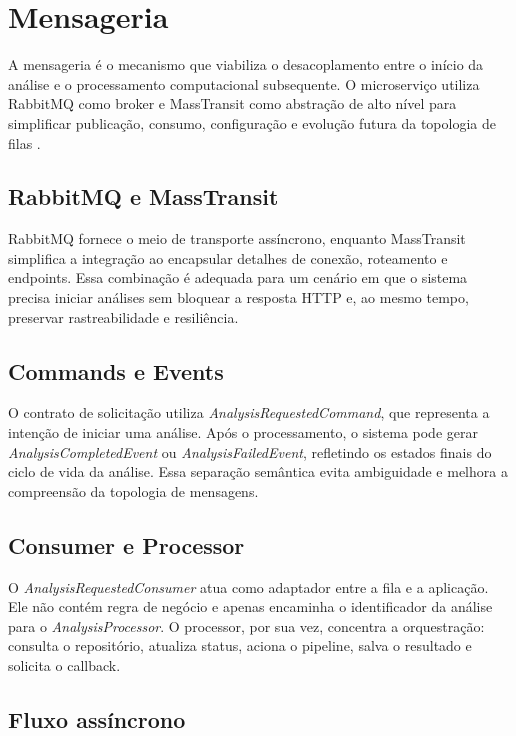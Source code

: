 \chapter{Mensageria}

A mensageria é o mecanismo que viabiliza o desacoplamento entre o início da análise e o processamento computacional subsequente. O microserviço utiliza RabbitMQ como broker e MassTransit como abstração de alto nível para simplificar publicação, consumo, configuração e evolução futura da topologia de filas \cite{rabbitmqdocs,masstransitdocs}.

\section{RabbitMQ e MassTransit}

RabbitMQ fornece o meio de transporte assíncrono, enquanto MassTransit simplifica a integração ao encapsular detalhes de conexão, roteamento e endpoints. Essa combinação é adequada para um cenário em que o sistema precisa iniciar análises sem bloquear a resposta HTTP e, ao mesmo tempo, preservar rastreabilidade e resiliência.

\section{Commands e Events}

O contrato de solicitação utiliza \textit{AnalysisRequestedCommand}, que representa a intenção de iniciar uma análise. Após o processamento, o sistema pode gerar \textit{AnalysisCompletedEvent} ou \textit{AnalysisFailedEvent}, refletindo os estados finais do ciclo de vida da análise. Essa separação semântica evita ambiguidade e melhora a compreensão da topologia de mensagens.

\section{Consumer e Processor}

O \textit{AnalysisRequestedConsumer} atua como adaptador entre a fila e a aplicação. Ele não contém regra de negócio e apenas encaminha o identificador da análise para o \textit{AnalysisProcessor}. O processor, por sua vez, concentra a orquestração: consulta o repositório, atualiza status, aciona o pipeline, salva o resultado e solicita o callback.

\section{Fluxo assíncrono}

